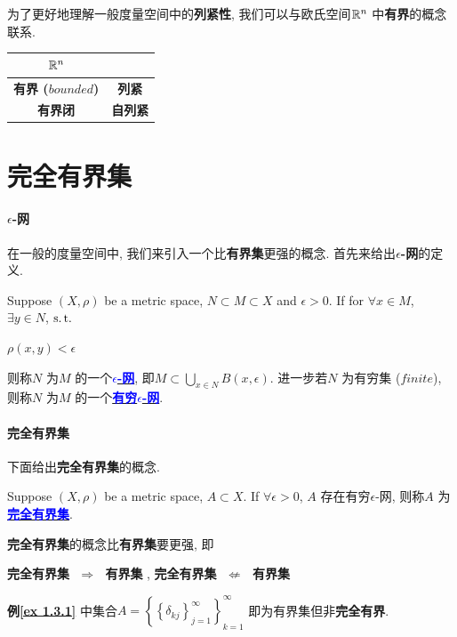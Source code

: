 \vspace*{6em}

	为了更好地理解一般度量空间中的\textbf{列紧性}, 我们可以与欧氏空间$\mathbb{R}^n$ 中\textbf{有界}的概念联系.
	\vspace*{1em}
	\begin{center}
		\begin{tabular}{c|c}
			$\mathbb{R}^n$ &\text{度量空间} \\
			\hline
			\textbf{有界 ($bounded$)} &\textbf{列紧} \\
			\hline
			\textbf{有界闭} &\textbf{自列紧}
		\end{tabular}
	\end{center}

\newpage

\section{完全有界集}
\paragraph{$\epsilon$-网}
	在一般的度量空间中, 我们来引入一个比\textbf{有界集}更强的概念. 首先来给出\textbf{$\epsilon$-网}的定义.
	\begin{defn}\label{def 1.4.1}
		Suppose $(X , \rho)$ be a metric space, $N \subset M \subset X$ and $\epsilon > 0$. If for $\forall x \in M$, $\exists y \in N$, $\operatorname{s.t.}$
		\begin{center}
			$\rho(x , y) < \epsilon$
		\end{center}
		则称$N$ 为$M$ 的一个\underline{\textcolor{blue}{\textbf{$\epsilon$-网}}}, 即$M \subset \underset{x \in N}{\bigcup}{B(x , \epsilon)}$. 进一步若$N$ 为有穷集 ($finite$), 则称$N$ 为$M$ 的一个\underline{\textcolor{blue}{\textbf{有穷$\epsilon$-网}}}.
	\end{defn}
	
	\vspace*{6em}
\paragraph{完全有界集}
	下面给出\textbf{完全有界集}的概念.
	\begin{defn}\label{def 1.4.2}
		Suppose $(X , \rho)$ be a metric space, $A \subset X$. If $\forall \epsilon > 0$, $A$ 存在有穷$\epsilon$-网, 则称$A$ 为\underline{\textcolor{blue}{\textbf{完全有界集}}}.
		
		\vspace*{2em}
		\begin{rmk}
			\textbf{完全有界集}的概念比\textbf{有界集}要更强, 即
			\begin{center}
				\textbf{完全有界集} $\,\, \Rightarrow \,\,$ \textbf{有界集} \hspace*{1em} , \hspace*{1em} \textbf{完全有界集} $\,\, \not\Leftarrow \,\,$ \textbf{有界集}
			\end{center}
			\vspace*{1em}
			\textbf{例\ref{ex 1.3.1}} 中集合$A = \left\{ \left\{ \delta_{kj} \right\}_{j = 1}^{\infty}  \right\}_{k = 1}^{\infty}$ 即为有界集但非\textbf{完全有界}.
		\end{rmk}
	\end{defn}

